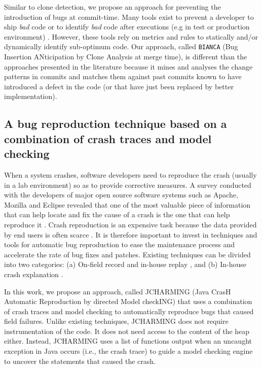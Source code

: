 Similar to clone detection, we propose an approach for preventing the introduction of bugs at commit-time.  Many tools exist to prevent a developer to ship {\it bad} code \cite{Dangel2000,Hovemeyer2007,Moha2010} or to identify {\it bad} code after executions (e.g in test or production environment) \cite{Nayrolles,Nayrolles2013a}. However, these tools rely on metrics and rules to statically and/or dynamically identify sub-optimum code. Our approach, called {\tt BIANCA} (Bug Insertion ANticipation by Clone Analysis at merge time), is different than the approaches presented in the literature because it mines and analyses the change patterns in commits and matches them against past commits known to have introduced a defect in the code (or that have just been replaced by better implementation).

\subsection{A bug reproduction technique based on a combination of crash traces and model checking}
When a system crashes, software developers need to reproduce the crash (usually in a lab environment) so as to provide corrective measures. A survey conducted with the developers of major open source software systems such as Apache, Mozilla and Eclipse revealed that one of the most valuable piece of information that can help locate and fix the cause of a crash is the one that can help reproduce it \cite{Bettenburg2008}. Crash reproduction is  an expensive task because the data provided by end users is often scarce \cite{Artzi2008,Jin2012,Chen2013}. It is therefore important to invest in techniques and tools for automatic bug reproduction to ease the maintenance process and accelerate the rate of bug fixes and patches.
Existing techniques can be divided into two categories: (a) On-field record and in-house replay \cite{Steven2000,Narayanasamy2005,Artzi2008,Roehm2015}, and (b) In-house crash explanation \cite{Jin2012,Jin2013,Zuddas2014,Chen2013a,Nayrolles2015}.

In this work, we propose an approach, called JCHARMING (Java CrasH Automatic Reproduction by directed Model checkING) that uses a combination of crash traces and model checking to automatically reproduce bugs that caused field failures.
Unlike existing techniques, JCHARMING does not require instrumentation of the code.
It does not need access to the content of the heap either.
Instead, JCHARMING uses a list of functions output when an uncaught exception in Java occurs (i.e., the crash trace) to guide a model checking engine to uncover the statements that caused the crash.

